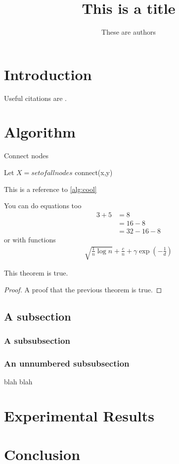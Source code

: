 \documentclass{article}
\title{This is a title}
\author{These are authors}
\begin{document}
\maketitle

\section{Introduction}

Useful citations are \cite{KW14,GKK13}.

\section{Algorithm}

\begin{algorithm}[H]
\caption{Connect nodes}\label{alg:cool}
\begin{algorithmic}
\State Let $X = set of all nodes$
\State connect(x,y)
\EndIf
\EndFor
\EndFor
\end{algorithmic}
\end{algorithm}

This is a reference to \cref{alg:cool}

You can do equations too
\begin{align}
3 + 5 
&= 8 \\
&= 16 - 8 \\
&= 32 - 16 - 8
\end{align}
or with functions
\begin{align}
\sqrt{\frac{1}{n} \log n} + \frac{c}{n} + \gamma \exp\left(-\frac{1}{d}\right)
\end{align}

\begin{theorem}
This theorem is true.
\end{theorem}

\begin{proof}
A proof that the previous theorem is true.
\end{proof}

\subsection{A subsection}

\subsubsection{A subsubsection}

\subsubsection*{An unnumbered subsubsection} blah blah

\section{Experimental Results}

\section{Conclusion}



\end{document}
